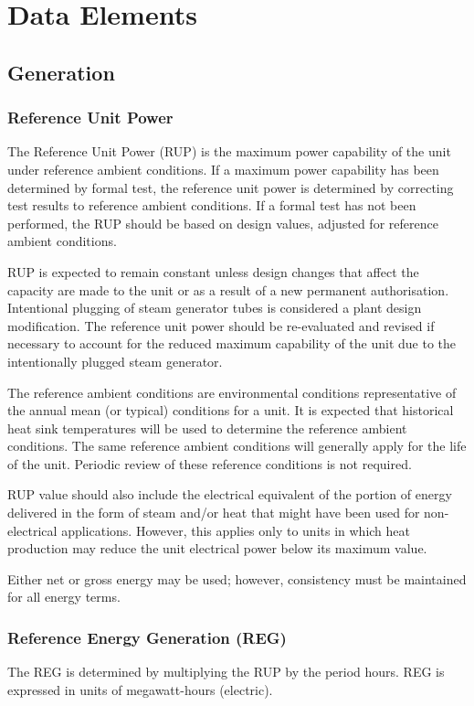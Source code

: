 \section{Data Elements}
\subsection{Generation}
\subsubsection{Reference Unit Power}

The Reference Unit Power (RUP) is the maximum power capability of the
unit under reference ambient conditions. If a maximum power capability
has been determined by formal test, the reference unit power is
determined by correcting test results to reference ambient
conditions. If a formal test has not been performed, the RUP should be
based on design values, adjusted for reference ambient conditions.

RUP is expected to remain constant unless design changes that affect
the capacity are made to the unit or as a result of a new permanent
authorisation. Intentional plugging of steam generator tubes is
considered a plant design modification. The reference unit power
should be re-evaluated and revised if necessary to account for the
reduced maximum capability of the unit due to the intentionally
plugged steam generator.

The reference ambient conditions are environmental conditions
representative of the annual mean (or typical) conditions for a
unit. It is expected that historical heat sink temperatures will be
used to determine the reference ambient conditions. The same reference
ambient conditions will generally apply for the life of the
unit. Periodic review of these reference conditions is not required.

RUP value should also include the electrical equivalent of the portion
of energy delivered in the form of steam and/or heat that might have
been used for non-electrical applications. However, this applies only
to units in which heat production may reduce the unit electrical power
below its maximum value.

Either net or gross energy may be used; however, consistency must be
maintained for all energy terms.

\subsubsection{Reference Energy Generation (REG)}
The REG is determined by multiplying the RUP by the period hours. REG
is expressed in units of megawatt-hours (electric).

